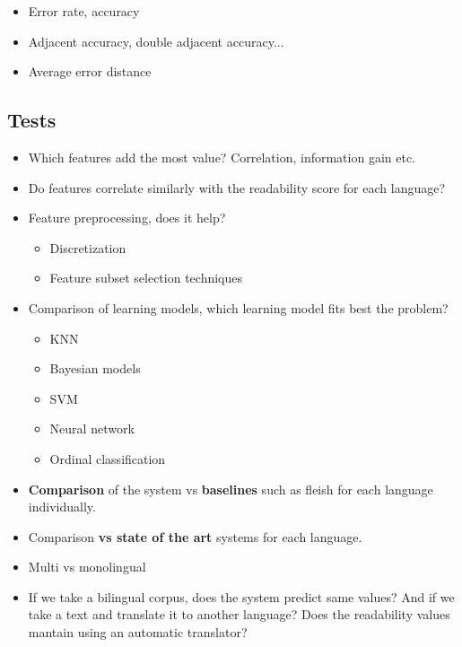 \documentclass[12pt]{article}
\begin{document}
\begin{itemize}
\item Error rate, accuracy
\item Adjacent accuracy, double adjacent accuracy...
\item Average error distance
\end{itemize}

\subsection{Tests}

\begin{itemize}

\item Which features add the most value? Correlation, information gain etc.

\item Do features correlate similarly with the readability score for each language?

\item Feature preprocessing, does it help?
	\begin{itemize}
	\item Discretization
	\item Feature subset selection techniques
	\end{itemize}
	
\item Comparison of learning models, which learning model fits best the problem?
	\begin{itemize}
	\item KNN
	\item Bayesian models
	\item SVM
	\item Neural network
	\item Ordinal classification
	\end{itemize}

\item \textbf{Comparison} of the system vs \textbf{baselines} such as fleish for each language individually.

\item Comparison \textbf{vs state of the art} systems for each language.

\item Multi vs monolingual
\item If we take a bilingual corpus, does the system predict same values? And if we take a text and translate it to another language? Does the readability values mantain using an automatic translator?
\end{itemize}
\end{document}
